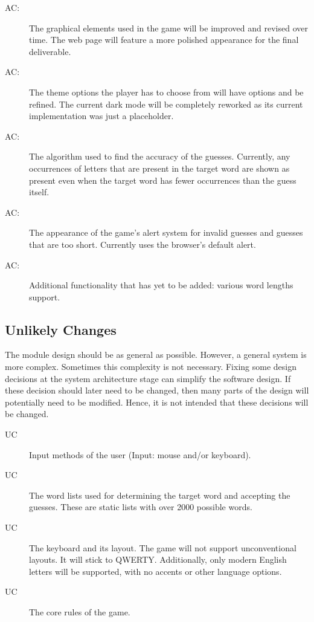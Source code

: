 \documentclass[12pt, titlepage]{article}
\newcounter{acnum}
\newcommand{\actheacnum}{AC\theacnum}
\newcounter{ucnum}
\newcommand{\uctheucnum}{UC\theucnum}
\begin{document}
	\begin{description}
		\item[ \actheacnum \label{ac1}:] The graphical elements used in the game will be improved and revised over time. The web page will feature a more polished appearance for the final deliverable. 
		\item[ \actheacnum \label{ac2}:] The theme options the player has to choose from will have options and be refined. The current dark mode will be completely reworked as its current implementation was just a placeholder. 
		\item[ \actheacnum \label{ac3}:] The algorithm used to find the accuracy of the guesses. Currently, any occurrences of letters that are present in the target word are shown as present even when the target word has fewer occurrences than the guess itself. 
		\item[ \actheacnum \label{ac4}:] The appearance of the game's alert system for invalid guesses and guesses that are too short. Currently uses the browser's default alert.
		\item[ \actheacnum \label{ac5}:] Additional functionality that has yet to be added: various word lengths support. 
		
	\end{description}
	
	\subsection{Unlikely Changes} \label{SecUchange}
	
	The module design should be as general as possible. However, a general system is
	more complex. Sometimes this complexity is not necessary. Fixing some design
	decisions at the system architecture stage can simplify the software design. If
	these decision should later need to be changed, then many parts of the design
	will potentially need to be modified. Hence, it is not intended that these
	decisions will be changed.
	
	\begin{description}
		\item[ \uctheucnum] Input methods of the user
		(Input: mouse and/or keyboard). 
		\item[ \uctheucnum] The word lists used for determining the target word and accepting the guesses. These are static lists with over 2000 possible words.
		\item[ \uctheucnum] The keyboard and its layout. The game will not support unconventional layouts. It will stick to QWERTY. Additionally, only modern English letters will be supported, with no accents or other language options. 
		\item[ \uctheucnum] The core rules of the game.
	\end{description}
	
\end{document}
